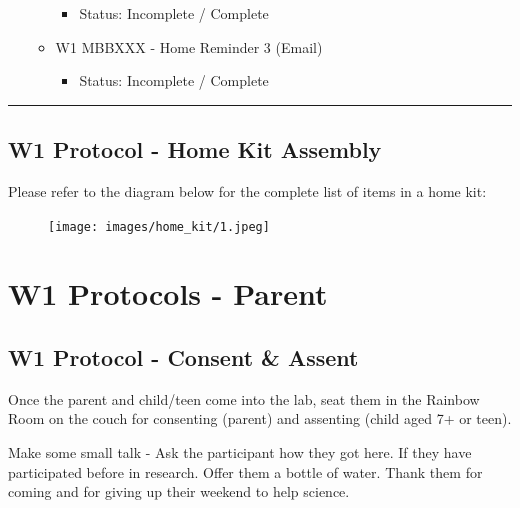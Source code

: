 \documentclass[
]{book}
\providecommand{\tightlist}{%
  \setlength{\itemsep}{0pt}\setlength{\parskip}{0pt}}
\begin{document}
\begin{itemize}
\begin{itemize}
    \begin{itemize}
    \tightlist
    \item
      Status: Incomplete / Complete
    \end{itemize}
  \item
    W1 MBBXXX - Home Reminder 3 (Email)

    \begin{itemize}
    \tightlist
    \item
      Status: Incomplete / Complete
    \end{itemize}
  \end{itemize}
\end{itemize}

\begin{center}\rule{0.5\linewidth}{0.5pt}\end{center}

\hypertarget{w1-protocol---home-kit-assembly}{%
\subsection{W1 Protocol - Home Kit Assembly}\label{w1-protocol---home-kit-assembly}}

Please refer to the diagram below for the complete list of items in a home kit:

\begin{figure}
\centering
\texttt{[image: images/home\_kit/1.jpeg]}
\caption{}
\end{figure}

\hypertarget{w1-protocols---parent}{%
\section{W1 Protocols - Parent}\label{w1-protocols---parent}}

\hypertarget{w1-protocol---consent-assent}{%
\subsection{W1 Protocol - Consent \& Assent}\label{w1-protocol---consent-assent}}

Once the parent and child/teen come into the lab, seat them in the Rainbow Room on the couch for consenting (parent) and assenting (child aged 7+ or teen).

Make some small talk - Ask the participant how they got here. If they have participated before in research. Offer them a bottle of water. Thank them for coming and for giving up their weekend to help science.
\end{document}
